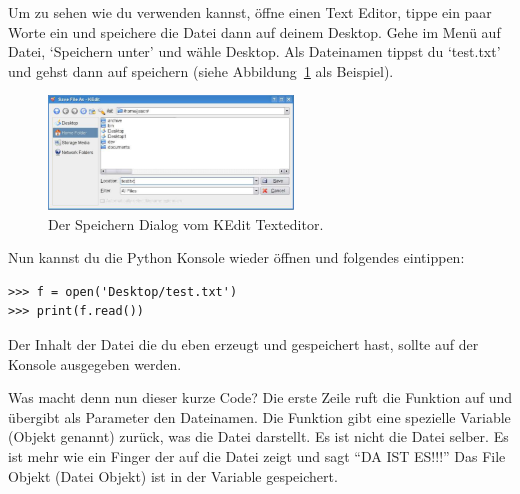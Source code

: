 \begin{LINUX}
Um zu sehen wie du  verwenden kannst, öffne einen Text Editor, tippe ein paar Worte ein und speichere die Datei dann auf deinem Desktop. Gehe im Menü auf Datei, `Speichern unter' und wähle Desktop. Als Dateinamen tippst du `test.txt' und gehst dann auf speichern (siehe Abbildung~\ref{fig19} als Beispiel).

\begin{figure}
\begin{center}
\includegraphics[width=65mm]{images/figure19}
\end{center}
\caption{Der Speichern Dialog vom KEdit Texteditor.}\label{fig19}
\end{figure}

Nun kannst du die Python Konsole wieder öffnen und folgendes eintippen:

\begin{Verbatim}[frame=single]
>>> f = open('Desktop/test.txt')
>>> print(f.read())
\end{Verbatim}

Der Inhalt der Datei die du eben erzeugt und gespeichert hast, sollte auf der Konsole ausgegeben werden. %
\end{LINUX}

Was macht denn nun dieser kurze Code? Die erste Zeile ruft die Funktion  auf und übergibt als Parameter den Dateinamen. Die Funktion gibt eine spezielle Variable (Objekt genannt) zurück, was die Datei darstellt. Es ist nicht die Datei selber. Es ist mehr wie ein Finger der auf die Datei zeigt und sagt ``DA IST ES!!!'' Das File Objekt (Datei Objekt) ist in der Variable  gespeichert.

